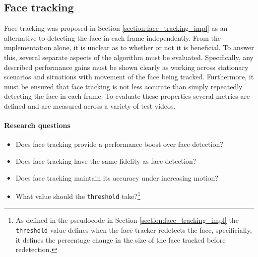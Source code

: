 \subsection{Face tracking}
Face tracking was proposed in Section \ref{section:face_tracking_impl} as an alternative to detecting the face in each frame independently.
From the implementation alone, it is unclear as to whether or not it is beneficial. To answer this, several separate aspects of the algorithm must be evaluated. 
Specifically, any described performance gains must be shown clearly as working across stationary scenarios and situations with movement of the face being tracked. 
Furthermore, it must be ensured that face tracking is not less accurate than simply repeatedly detecting the face in each frame. 
To evaluate these properties several metrics are defined and are measured across a variety of test videos.
\paragraph{Research questions}
\begin{itemize}
    \item Does face tracking provide a performance boost over face detection?
    \item Does face tracking have the same fidelity as face detection?
    \item Does face tracking maintain its accuracy under increasing motion?
    \item What value should the \texttt{threshold} take?\footnote{As defined in the pseudocode in Section \ref{section:face_tracking_impl} the \texttt{threshold} value defines when the face tracker redetects the face, specificially, it defines the percentage change in the size of the face tracked before redetection. }
\end{itemize}
